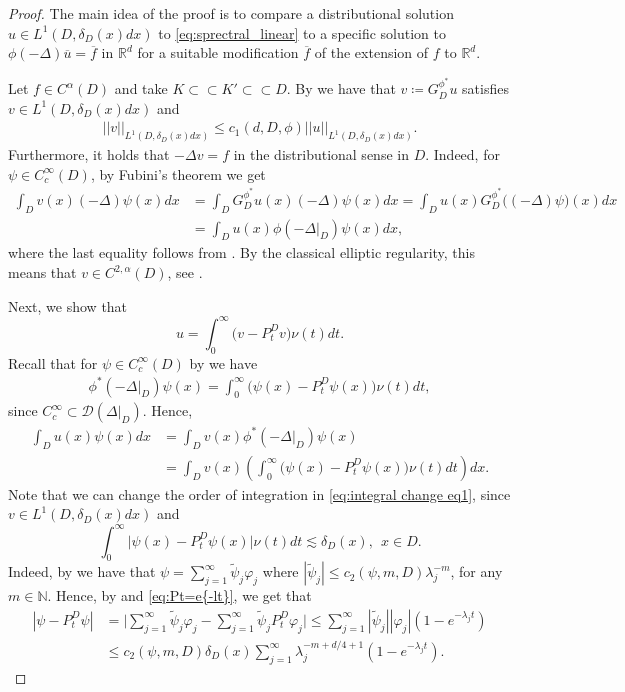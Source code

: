 \documentclass[12pt,a4paper,onecolumn]{amsart}
\theoremstyle{definition}
\newcommand{\R}{\mathbb{R}}
\newcommand{\N}{\mathbb{N}}
\newcommand{\subsub}{\subset\subset}
\newcommand{\1}{\mathbf 1}
\newcommand{\LLL}{L^1(D,\de(x)dx)}
\newcommand{\DD}{\mathcal{D}}
\newcommand{\Lo}{\phi(-\left.\Delta\right\vert_{D})}
\newcommand{\Loz}{\phi^*(-\left.\Delta\right\vert_{D})}
\newcommand{\LoR}{\phi(-\Delta)}
\newcommand{\GDfz}{G^{\phi^*}_{ D}}
\newcommand{\de}{\delta_D}
\newcommand{\wt}{\widetilde}
\numberwithin{equation}{section}
\begin{document}
\begin{proof}
    The main idea of the proof is to compare a distributional solution $u\in \LLL$ to \eqref{eq:sprectral_linear} to a specific solution to
    $\LoR \overline u=\overline f$ in $\R^d$ for a suitable modification $\overline f$ of the extension of $f$ to $\R^d$.

Let $f\in C^\alpha(D)$ and take $K\subsub K'\subsub D$. By \cite[Corollary 2.9]{Bio23} we have that $v\coloneqq \GDfz u$ satisfies $v\in \LLL$ and 
    \begin{align}\label{eq:v in LLL}
        ||v||_{\LLL}\le c_1(d,D,\phi)||u||_{\LLL}.
    \end{align}
    Furthermore, it holds that $-\Delta v=f$ in the distributional sense in $D$. Indeed, for $\psi\in C_c^\infty(D)$, by Fubini's theorem we get
    \begin{align*}
	\int_Dv(x)(-\Delta)\psi(x)dx&=\int_D\GDfz u(x)(-\Delta)\psi(x)dx=\int_Du(x)\GDfz\big((-\Delta)\psi\big)(x)dx\\
	&=\int_D u(x)\Lo \psi(x)dx,
    \end{align*}
	where the last equality follows from \cite[Lemma 2.7 \& Proposition 2.2]{Bio23}. By the classical elliptic regularity, this means that $v\in C^{2,\alpha}(D)$, see \cite[Section 2.2]{RosOtonFernRegularBook}.
	
	Next, we show that  
 \begin{equation}\label{eq:u_by_v}
     u=\int_0^\infty\big(v-P_t^Dv\big)\nu(t)dt.
 \end{equation}
 Recall that for $\psi \in C_c^\infty(D)$ by \cite[Eq. (2.30)]{Bio23} we have
	\begin{align*}
		\Loz \psi(x)=\int_0^\infty \big(\psi(x)-P_t^D\psi(x)\big)\nu(t)dt,
	\end{align*}
	since $C_c^\infty \subset \DD(\left.\Delta\right\vert_{D})$.
	Hence, 
	\begin{align}
		\int_D u(x)\psi(x)dx&=\int_D v(x)\Loz\psi(x)\nonumber\\
		&=\int_Dv(x)\left(\int_0^\infty\big(\psi(x)-P_t^D\psi(x)\big)\nu(t)dt\right)dx.\label{eq:integral change eq1}
	\end{align}
Note that we can change the order of integration in \eqref{eq:integral change eq1}, since $v\in \LLL$ and 
 \begin{equation}\label{eq:fubini_condition}
     \int_0^\infty\big|\psi(x)-P_t^D\psi(x)\big|\nu(t)dt\lesssim \delta_D(x),\ \ x\in D.
 \end{equation}
 Indeed, by \cite[Eq. (2.26)]{Bio23} we have that $\psi=\sum_{j=1}^\infty \wt \psi_j \varphi_j$ where  $|\wt \psi_j|\le c_2(\psi,m,D)\lambda_j^{-m}$, for any $m\in \N$. Hence, by \cite[Eq. (A.35) and the display after]{Bio23} and \eqref{eq:Pt=e{-lt}}, we get that  
	\begin{align*}
		|\psi-P_t^D\psi|&=\big|\sum_{j=1}^\infty \wt \psi_j \varphi_j-\sum_{j=1}^\infty \wt \psi_j P_t^D\varphi_j\big|\le\sum_{j=1}^\infty |\wt \psi_j| |\varphi_j|(1-e^{-\lambda_j t})\\
		&\le c_2(\psi,m,D)\de(x)\sum_{j=1}^\infty \lambda_j^{ -m+d/4+1} (1-e^{-\lambda_j t}).
	\end{align*}


\end{proof}
\end{document}
